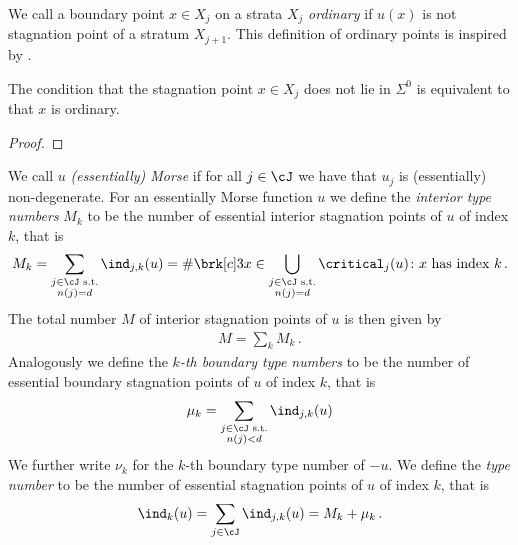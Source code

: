We call a boundary point $x\in X_j$ on a strata $X_j$ \emph{ordinary} if $u(x)$ is not 
stagnation point of a stratum $X_{j+1}$. This definition of ordinary points is inspired by \cite{Morse1970}.
\begin{proposition}
  The condition that the stagnation point $x\in X_j$ does not lie in $\Sigma^0$ is equivalent to that
  $x$ is ordinary.
\end{proposition}
\begin{proof}
\end{proof}

\begin{definition}
  We call $u$ \emph{(essentially) Morse} if for all $j\in\cJ$ we have that $u_j$ is (essentially) non-degenerate.
  For an essentially Morse function $u$ we define 
  the \emph{interior type numbers} $M_k$ to be the number of essential interior stagnation points of $u$ of index $k$, that is
  \begin{align}
    M_k=\sum_{\substack{j\in\cJ\text{ s.t.} \\ n(j)=d}}\ind_{j,k}(u)
    =\#\brk[c]3{x\in\bigcup_{\substack{j\in\cJ\text{ s.t.} \\ n(j)=d}}\critical_j(u)\colon x\text{ has index }k}\,.
    \label{eq:def_typenbr_interior}
  \end{align}
  The total number $M$ of interior
  stagnation points of $u$ is then given by
  \begin{align}
    M=\sum_kM_k\,.\label{eq:def_stagnationPtNbr}
  \end{align}
  Analogously we define the \emph{$k$-th boundary type numbers} to be the number of essential boundary 
  stagnation points of $u$ of index $k$, that is
  \begin{align}
    \mu_k=\sum_{\substack{j\in\cJ\text{ s.t.}\\ n(j)<d}}\ind_{j,k}(u)\label{eq:bdTypeNbrs}
  \end{align}
  We further write $\nu_k$ for the $k$-th boundary type number of $-u$.
  We define the \emph{type number} to be the number of
  essential stagnation points of $u$ of index $k$, that is
  \begin{align}
    \ind_k(u)=\sum_{j\in\cJ}\ind_{j,k}(u)=M_k+\mu_k\,.\label{eq:def_typenbr_total}
  \end{align}
\end{definition}

